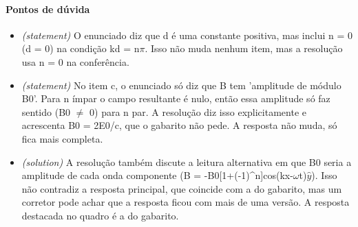 \documentclass{article}%
\begin{document}
\paragraph{Pontos de dúvida}%
\begin{itemize}%
\item%
\textit{(statement)} O enunciado diz que d é uma constante positiva, mas inclui n = 0 (d = 0) na condição kd = n$\pi$. Isso não muda nenhum item, mas a resolução usa n = 0 na conferência.%
\item%
\textit{(statement)} No item c, o enunciado só diz que B tem 'amplitude de módulo B0'. Para n ímpar o campo resultante é nulo, então essa amplitude só faz sentido (B0 $\neq$ 0) para n par. A resolução diz isso explicitamente e acrescenta B0 = 2E0/c, que o gabarito não pede. A resposta não muda, só fica mais completa.%
\item%
\textit{(solution)} A resolução também discute a leitura alternativa em que B0 seria a amplitude de cada onda componente (B = -B0{[}1+(-1)\^{}n{]}cos(kx-$\omega$t)$\hat y$). Isso não contradiz a resposta principal, que coincide com a do gabarito, mas um corretor pode achar que a resposta ficou com mais de uma versão. A resposta destacada no quadro é a do gabarito.%
\end{itemize}%
\end{document}
